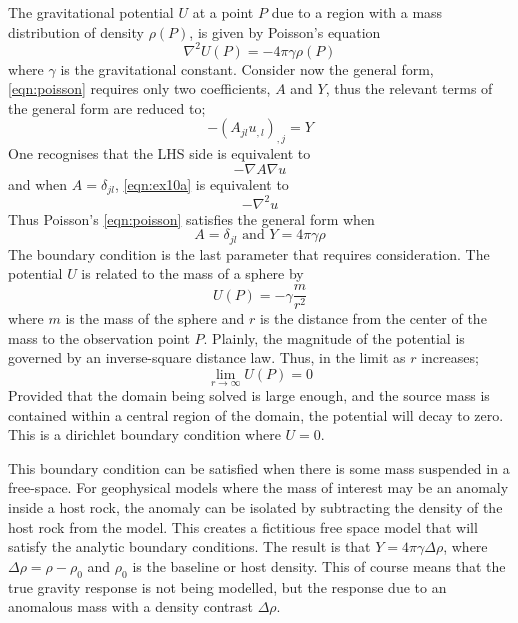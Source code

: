 The gravitational potential $U$ at a point $P$ due to a region with a mass
distribution of density $\rho(P)$, is given by Poisson's equation
\citep{Blakely1995}
\begin{equation} \label{eqn:poisson}
\nabla^2 U(P) = -4\pi\gamma\rho(P)
\end{equation}
where $\gamma$ is the gravitational constant.
Consider now the \esc general form, 
\autoref{eqn:poisson} requires only two coefficients,
$A$ and $Y$, thus the relevant terms of the general form are reduced to;
\begin{equation}
-\left(A_{jl} u_{,l} \right)_{,j} = Y
\end{equation}
One recognises that the LHS side is equivalent to 
\begin{equation} \label{eqn:ex10a}
-\nabla A \nabla u
\end{equation}
and when $A=\delta_{jl}$, \autoref{eqn:ex10a} is equivalent to
\begin{equation*}
-\nabla^2 u
\end{equation*}
Thus Poisson's \autoref{eqn:poisson} satisfies the general form when
\begin{equation}
A=\delta_{jl} \text{ and } Y= 4\pi\gamma\rho
\end{equation}
The boundary condition is the last parameter that requires consideration. The
potential $U$ is related to the mass of a sphere by
\begin{equation}
U(P)=-\gamma \frac{m}{r^2}
\end{equation} where $m$ is the mass of the sphere and $r$ is the distance from
the center of the mass to the observation point $P$. Plainly, the magnitude
of the potential is governed by an inverse-square distance law. Thus, in the
limit as $r$ increases;
\begin{equation}
\lim_{r\to\infty} U(P) = 0
\end{equation}
Provided that the domain being solved is large enough, and the source mass is
contained within a central region of the domain, the potential will decay to
zero. This is a dirichlet boundary condition where $U=0$.

This boundary condition can be satisfied when there is some mass suspended in a
free-space. For geophysical models where the mass of interest may be an anomaly
inside a host rock, the anomaly can be isolated by subtracting the density of the
host rock from the model. This creates a fictitious free space model that will
satisfy the analytic boundary conditions. The result is that
$Y=4\pi\gamma\Delta\rho$, where $\Delta\rho=\rho-\rho_0$ and $\rho_0$ is the
baseline or host density. This of course means that the true gravity response is
not being modelled, but the response due to an anomalous mass with a
density contrast $\Delta\rho$.

